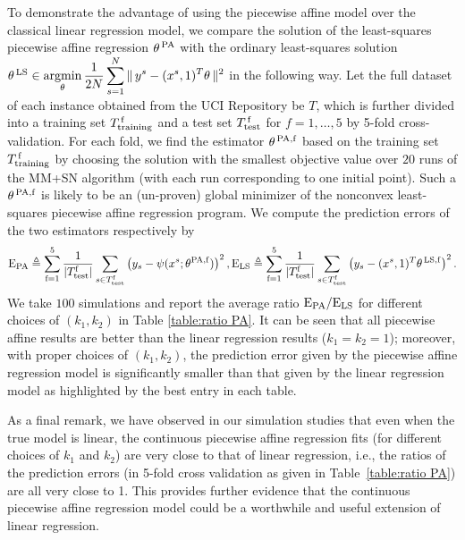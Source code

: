 \documentclass{siamart}
\begin{document}
To demonstrate the advantage of using the piecewise affine model over the classical linear regression model,
we compare the solution of the least-squares piecewise affine regression $\theta^{\,\rm PA}$ with the ordinary least-squares solution
$\theta^{\,\rm LS} \in  \displaystyle\operatornamewithlimits{\mbox{argmin}}_{\theta} \displaystyle\frac{1}{2N}\sum_{s=1}^N\|\,y^{s} - (x^{s},1)^T\theta\,\|^2$
in the following way. Let the full dataset of each instance obtained  from the UCI Repository be $T$, which is further divided  into a training
set $T^{\, \rm f}_{\rm training}$ and a test set $T^{\, \rm f}_{\rm test}$ for $f = 1, \ldots, 5$ by 5-fold cross-validation.
For each fold, we find the estimator $\theta^{\,{\rm PA},\rm f}$  based on the training set $T^{\, \rm f}_{\rm training}$  by choosing the solution
with the smallest objective value over $20$ runs of the MM+SN  algorithm (with each run corresponding to one initial point).
Such a $\theta^{\,\rm PA,f}$
is likely to be an (un-proven) global minimizer of the nonconvex least-squares piecewise affine regression program.
We compute the prediction errors of the two estimators respectively by
{\small \[{\rm E}_{{\rm PA}}\triangleq \displaystyle\sum_{\rm f = 1}^5\frac{1}{|T^{\rm f}_{\rm test}|}\sum_{s\in T_{\rm test}^{\rm f}} \left(y_{s} -
\psi(x^s;\theta^{\rm PA,f})\right)^2,
{\rm E}_{{\rm LS}}\triangleq\displaystyle\sum_{\rm f = 1}^5 \frac{1}{|T^{ \rm f}_{\rm test}|}\sum_{s\in T^{\rm f}_{\rm test}}
\left(y_{s} - (x^{s},1)^T\theta^{\,{\rm LS,f}}\right)^2.
\]}
We take $100$ simulations %
and report the average ratio
${\rm E}_{\rm PA}/{\rm E}_{\rm LS}$ for different choices of $(k_1, k_2)$ in Table \ref{table:ratio PA}.
It can be seen that all piecewise affine results are better than the linear regression results ($k_1 = k_2 = 1$);
moreover, with proper choices of $(k_1, k_2)$, the prediction error given by the piecewise affine regression
model is significantly smaller than that given by the linear regression model as highlighted by the best entry in each table.


As a final remark, we have observed in our simulation studies that even when the true model is linear, the continuous piecewise affine regression fits (for different choices of
$k_1$ and $k_2$) are very close to that of linear regression, i.e., the ratios of the prediction errors (in 5-fold cross validation as given in Table~\ref{table:ratio PA}) are all very close to 1. This provides further evidence that the continuous piecewise affine regression model could be a worthwhile and useful extension of linear regression. %
\end{document}
